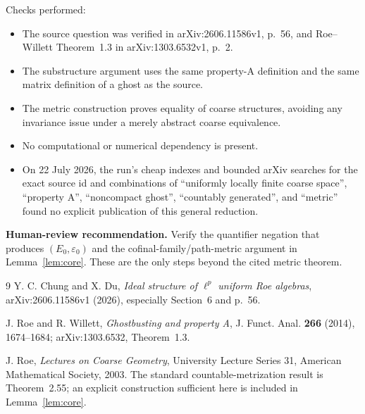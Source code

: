 \documentclass[11pt]{article}
\begin{document}
Checks performed:
\begin{itemize}[leftmargin=*]
\item The source question was verified in arXiv:2606.11586v1, p.~56, and
Roe--Willett Theorem~1.3 in arXiv:1303.6532v1, p.~2.
\item The substructure argument uses the same property-A definition and the
same matrix definition of a ghost as the source.
\item The metric construction proves equality of coarse structures, avoiding
any invariance issue under a merely abstract coarse equivalence.
\item No computational or numerical dependency is present.
\item On 22 July 2026, the run's cheap indexes and bounded arXiv searches for
the exact source id and combinations of ``uniformly locally finite coarse
space'', ``property A'', ``noncompact ghost'', ``countably generated'', and
``metric'' found no explicit publication of this general reduction.
\end{itemize}

\textbf{Human-review recommendation.} Verify the quantifier negation that
produces $(E_0,\varepsilon_0)$ and the cofinal-family/path-metric argument in
Lemma~\ref{lem:core}.  These are the only steps beyond the cited metric
theorem.

\begin{thebibliography}{9}
Y. C. Chung and X. Du,
\emph{Ideal structure of $\ell^p$ uniform Roe algebras},
arXiv:2606.11586v1 (2026), especially Section~6 and p.~56.

J. Roe and R. Willett,
\emph{Ghostbusting and property A},
J. Funct. Anal. \textbf{266} (2014), 1674--1684;
arXiv:1303.6532, Theorem~1.3.

J. Roe,
\emph{Lectures on Coarse Geometry},
University Lecture Series 31, American Mathematical Society, 2003.
The standard countable-metrization result is Theorem~2.55; an explicit
construction sufficient here is included in Lemma~\ref{lem:core}.
\end{thebibliography}
\end{document}
